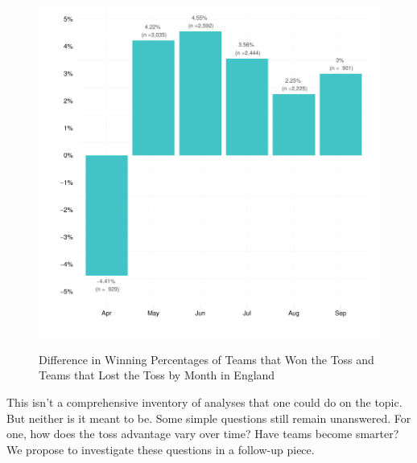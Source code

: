 \documentclass[12pt]{article}
\begin{document}
\begin{figure}[htbp]
\centering
\caption{Difference in Winning Percentages of Teams that Won the Toss and Teams that Lost the Toss by Month in England}
\includegraphics[scale=.85]{../figs/winbyMonthEngland.pdf}
\label{fig:season}
\end{figure}

This isn't a comprehensive inventory of analyses that one could do on the topic. But neither is it meant to be. Some simple questions still remain unanswered. For one, how does the toss advantage vary over time? Have teams become smarter?  We propose to investigate these questions in a follow-up piece.

\clearpage


\end{document}
